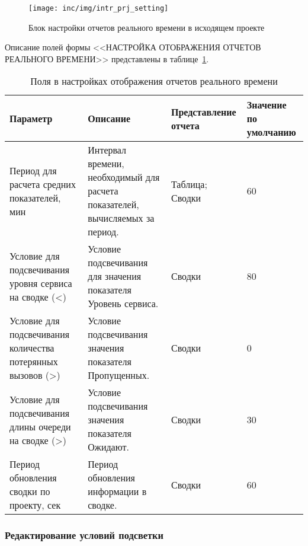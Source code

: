 \begin{figure}[ht]
    \centering
    \texttt{[image: inc/img/intr\_prj\_setting]}
    \caption{Блок настройки отчетов реального времени в исходящем проекте}
    \label{pic:prj:setting:fields}
\end{figure}

Описание полей формы <<НАСТРОЙКА ОТОБРАЖЕНИЯ ОТЧЕТОВ РЕАЛЬНОГО ВРЕМЕНИ>> представлены в таблице~\ref{tab:prj:setting:fields}.
\begin{table}[ht]
    \caption{Поля в настройках отображения отчетов реального времени}
    \begin{small}
        \begin{tabular}{|p{}|p{}|p{}|p{}|}
            \hline
            Параметр & Описание & Представление отчета & Значение по умолчанию \\
            \hline
            Период для расчета средних показателей, мин &
            Интервал времени, необходимый для расчета показателей, вычисляемых за период. &
            Таблица; Сводки &
            60\\
            \hline
            Условие для подсвечивания уровня сервиса на сводке (<) &
            Условие подсвечивания для значения показателя Уровень сервиса. &
            Сводки &
            80 \\
            \hline
            Условие для подсвечивания количества потерянных вызовов (>) &
            Условие подсвечивания значения показателя Пропущенных. &
            Сводки &
            0 \\
            \hline
            Условие для подсвечивания длины очереди на сводке (>) &
            Условие подсвечивания значения показателя Ожидают. &
            Сводки &
            30 \\
            \hline
            Период обновления сводки по проекту, сек &
            Период обновления информации в сводке. &
            Сводки &
            60 \\
            \hline
        \end{tabular}
    \end{small}
    \label{tab:prj:setting:fields}
\end{table}

\subsubsection{Редактирование условий подсветки}

